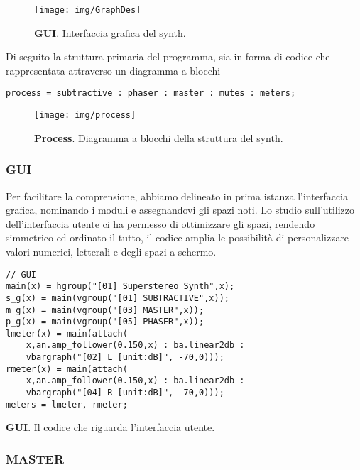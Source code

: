 \documentclass[
	a4paper,
	twocolumn
	]{article}
\begin{document}
\begin{figure}[h]
\begin{center}
\texttt{[image: img/GraphDes]}
\caption{\textbf{GUI}. Interfaccia grafica del synth.}
\label{gr01}
\end{center}
\end{figure}

Di seguito la struttura primaria del programma, sia in forma di codice che
rappresentata attraverso un diagramma a blocchi

\begin{lstlisting}
process = subtractive : phaser : master : mutes : meters;
\end{lstlisting}

\begin{figure}[h]
\begin{center}
\texttt{[image: img/process]}
\caption{\textbf{Process}. Diagramma a blocchi della struttura del synth.}
\label{gr01}
\end{center}
\end{figure}

\subsubsection*{GUI}
 Per facilitare la comprensione, abbiamo delineato in prima istanza l’interfaccia grafica, nominando i moduli e assegnandovi gli spazi noti. Lo studio sull’utilizzo dell’interfaccia utente ci ha permesso di ottimizzare gli spazi, rendendo simmetrico ed ordinato il tutto, il codice amplia le possibilità di personalizzare valori numerici, letterali e degli spazi a schermo.
\begin{lstlisting}
// GUI
main(x) = hgroup("[01] Superstereo Synth",x);
s_g(x) = main(vgroup("[01] SUBTRACTIVE",x));
m_g(x) = main(vgroup("[03] MASTER",x));
p_g(x) = main(vgroup("[05] PHASER",x));
lmeter(x) = main(attach(
	x,an.amp_follower(0.150,x) : ba.linear2db :
	vbargraph("[02] L [unit:dB]", -70,0)));
rmeter(x) = main(attach(
	x,an.amp_follower(0.150,x) : ba.linear2db :
	vbargraph("[04] R [unit:dB]", -70,0)));
meters = lmeter, rmeter;
\end{lstlisting}

\caption{\textbf{GUI}. Il codice che riguarda l'interfaccia utente.}

\subsubsection*{MASTER}
\end{document}
